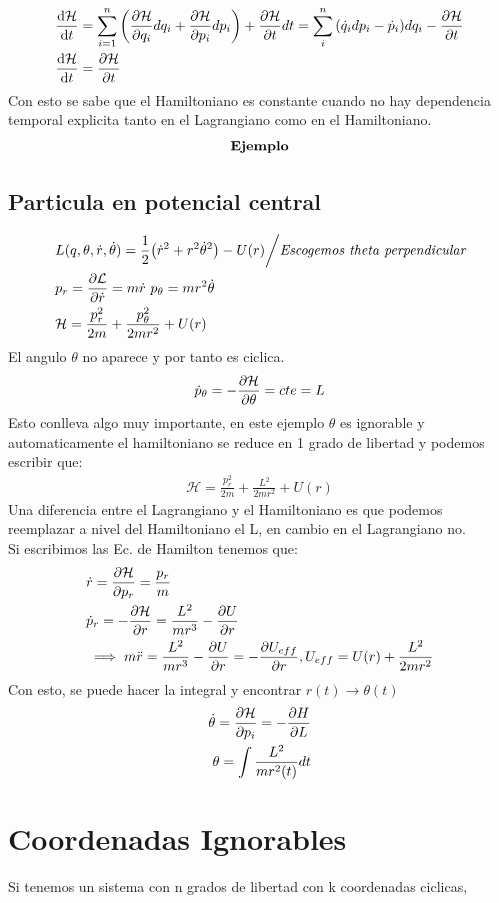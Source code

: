 \documentclass[12pt]{article}
\newcommand{\s}[1]{\section{#1}}
\newcommand{\mc}[1]{\mathcal{#1}}
\newcommand{\sumn}[1]{\sum_{#1 =1}^{n}}
\renewcommand{\ss}[1]{\subsection{#1}}
\newcommand{\ej}{\[\textrm{\textbf{Ejemplo}} \]}
\begin{document}
\begin{align}
	 &\dv{\mathcal{H}}{t}= \sumn{i} \qty(\pdv{\mc{H}}{q_i}dq_i + \pdv{\mc{H}}{p_i}dp_i)+ \pdv{\mc{H}}{t}dt \label{eq_HC}= \sum_{i}^{n} \qty(\dot{q}_i dp_i -\dot{p}_i)dq_i - \pdv{\mathcal{H}}{t}\\
	&\dv{\mc{H}}{t}=\pdv{\mc{H} }{t}
\end{align}
Con esto se sabe que el Hamiltoniano es constante cuando no hay dependencia temporal explicita tanto en el Lagrangiano como en el Hamiltoniano.\\
\ej
\ss{Particula en potencial central}
\begin{align}
&L(q,\theta,\dot{r},\dot{\theta})=\frac{1}{2}\qty(\dot{r}^2 + r^2 \dot{\theta}^2)	- U(r)\bigg/ \textit{Escogemos theta perpendicular}\\
&p_r= \pdv{\mc{L}}{\dot{r}}=m\dot{r}\,\, p_{\theta} = mr^2 \dot{\theta}\\
&\mc{H}= \frac{p_r^2}{2m}+ \frac{p_{\theta}^2}{2mr^2}+U(r)
\end{align}
El angulo $\theta$ no aparece y por tanto es ciclica.
\begin{align}
\dot{p}_{\theta}=- \pdv{\mc{H}}{\theta}=cte=L
\end{align}
Esto conlleva algo muy importante, en este ejemplo $\theta$ es ignorable y automaticamente el hamiltoniano se reduce en 1 grado de libertad y podemos escribir que:
\begin{align}
\mc{H}= 	\frac{p_r^2}{2m}+ \frac{L^2}{2mr^2}+U(r)
\end{align}
Una diferencia entre el Lagrangiano y el Hamiltoniano es que podemos reemplazar a nivel del Hamiltoniano el L, en cambio en el Lagrangiano no.\\
\newpage
Si escribimos las Ec. de Hamilton tenemos que:
\begin{align}
	&\dot{r}= \pdv{\mc{H}}{p_r}= \frac{p_r}{m}\\
	&\dot{p}_r=- \pdv{\mc{H}}{r}= \frac{L^2}{mr^3}-\pdv{U}{r}\\
	&\implies m\ddot{r}=\frac{L^2}{mr^3}- \pdv{U}{r} = - \pdv{U_{eff}}{r}, U_{eff}= U(r)+ \frac{L^2}{2mr^2}
\end{align}
Con esto, se puede hacer la integral y encontrar $r(t)\rightarrow \theta(t)$
\begin{align}
\dot{\theta} = \pdv{\mc{H}}{p_i} = - \pdv{H}{L}\\
\theta = \int \frac{L^2}{mr^2(t)}dt	
\end{align}
 \s{Coordenadas Ignorables}
Si tenemos un sistema con n grados de libertad con k coordenadas ciclicas,
\end{document}
